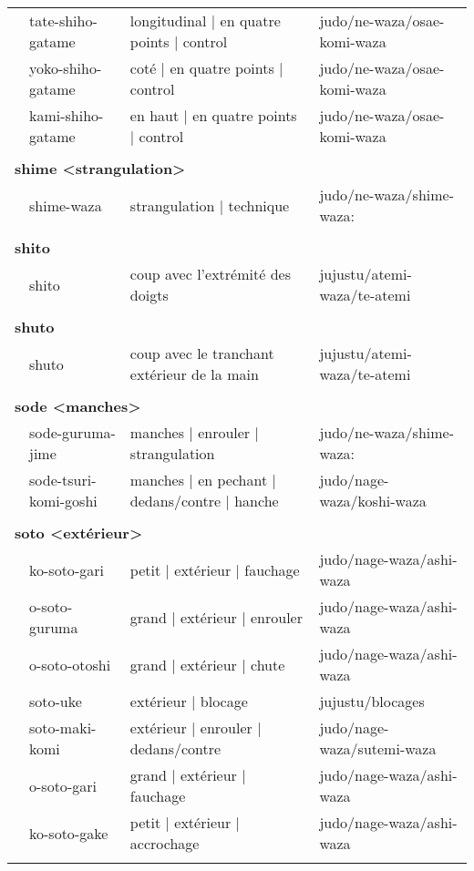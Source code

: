 \documentclass{article}%
\begin{document}
\begin{longtable}{rlll}
&tate{-}shiho{-}gatame&longitudinal | en quatre points | control&judo/ne{-}waza/osae{-}komi{-}waza\\%
&yoko{-}shiho{-}gatame&coté | en quatre points | control&judo/ne{-}waza/osae{-}komi{-}waza\\%
&kami{-}shiho{-}gatame&en haut | en quatre points | control&judo/ne{-}waza/osae{-}komi{-}waza\\%
&&&\\%
\multicolumn{3}{l}{\textbf{shime <strangulation>}%
~%
}&\\%
&shime{-}waza&strangulation | technique&judo/ne{-}waza/shime{-}waza:\\%
&&&\\%
\multicolumn{3}{l}{\textbf{shito }%
~%
}&\\%
&shito&coup avec l'extrémité des doigts&jujustu/atemi{-}waza/te{-}atemi\\%
&&&\\%
\multicolumn{3}{l}{\textbf{shuto }%
~%
}&\\%
&shuto&coup avec le tranchant extérieur de la main&jujustu/atemi{-}waza/te{-}atemi\\%
&&&\\%
\multicolumn{3}{l}{\textbf{sode <manches>}%
~%
}&\\%
&sode{-}guruma{-}jime&manches | enrouler | strangulation&judo/ne{-}waza/shime{-}waza:\\%
&sode{-}tsuri{-}komi{-}goshi&manches | en pechant | dedans/contre | hanche&judo/nage{-}waza/koshi{-}waza\\%
&&&\\%
\multicolumn{3}{l}{\textbf{soto <extérieur>}%
~%
}&\\%
&ko{-}soto{-}gari&petit | extérieur | fauchage&judo/nage{-}waza/ashi{-}waza\\%
&o{-}soto{-}guruma&grand | extérieur | enrouler&judo/nage{-}waza/ashi{-}waza\\%
&o{-}soto{-}otoshi&grand | extérieur | chute&judo/nage{-}waza/ashi{-}waza\\%
&soto{-}uke&extérieur | blocage&jujustu/blocages\\%
&soto{-}maki{-}komi&extérieur | enrouler | dedans/contre&judo/nage{-}waza/sutemi{-}waza\\%
&o{-}soto{-}gari&grand | extérieur | fauchage&judo/nage{-}waza/ashi{-}waza\\%
&ko{-}soto{-}gake&petit | extérieur | accrochage&judo/nage{-}waza/ashi{-}waza\\%
&&&\\%

\end{longtable}
\end{document}
